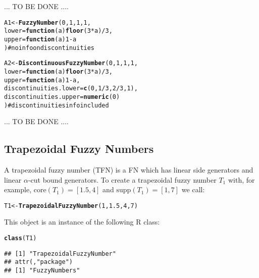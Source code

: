 \documentclass[11pt]{article}\usepackage{graphicx, color}
\makeatletter
\newcommand{\hlfunctioncall}[1]{\textcolor[rgb]{0.501960784313725,0,0.329411764705882}{\textbf{#1}}}%
\newcommand{\hlcomment}[1]{\textcolor[rgb]{0.180392156862745,0.6,0.341176470588235}{#1}}%
\newenvironment{kframe}{%
 \def\at@end@of@kframe{}%
 \ifinner\ifhmode%
  \def\at@end@of@kframe{\end{minipage}}%
  \begin{minipage}{\columnwidth}%
 \fi\fi%
 \def\FrameCommand##1{\hskip\@totalleftmargin \hskip-\fboxsep
 \colorbox{shadecolor}{##1}\hskip-\fboxsep
     \hskip-\linewidth \hskip-\@totalleftmargin \hskip\columnwidth}%
 \MakeFramed {\advance\hsize-\width
   \@totalleftmargin\z@ \linewidth\hsize
   \@setminipage}}%
 {\par\unskip\endMakeFramed%
 \at@end@of@kframe}
\newenvironment{knitrout}{}{} %
\newcommand{\lang}[1]{\textsf{#1}\xspace}
\newcommand{\R}{\lang{R}}
\makeatother
\begin{document}
... TO BE DONE ....

\begin{knitrout}\small
{}\color{fgcolor}\begin{kframe}
\begin{alltt}
A1 <- \hlfunctioncall{FuzzyNumber}(0,1,1,1,
         lower=\hlfunctioncall{function}(a) \hlfunctioncall{floor}(3*a)/3,
         upper=\hlfunctioncall{function}(a) 1-a
) \hlcomment{# no info on discontinuities}

A2 <- \hlfunctioncall{DiscontinuousFuzzyNumber}(0,1,1,1,
         lower=\hlfunctioncall{function}(a) \hlfunctioncall{floor}(3*a)/3,
         upper=\hlfunctioncall{function}(a) 1-a,
         discontinuities.lower=\hlfunctioncall{c}(0, 1/3, 2/3, 1),
         discontinuities.upper=\hlfunctioncall{numeric}(0)
) \hlcomment{# discontinuities info included}
\end{alltt}
\end{kframe}
\end{knitrout}




... TO BE DONE ....


\subsection{Trapezoidal Fuzzy Numbers}\label{Sec:TFNdef}

A trapezoidal fuzzy number (TFN) is a FN which has linear
side generators and linear $\alpha$-cut bound generators.
To create a trapezoidal fuzzy number $T_1$
with, for example, $\mathrm{core}(T_1)=[1.5,4]$
and $\mathrm{supp}(T_1)=[1,7]$ we call:

\begin{knitrout}\small
{}\color{fgcolor}\begin{kframe}
\begin{alltt}
T1 <- \hlfunctioncall{TrapezoidalFuzzyNumber}(1,1.5,4,7)
\end{alltt}
\end{kframe}
\end{knitrout}


\noindent
This object is an instance of the following \R class:

\begin{knitrout}\small
{}\color{fgcolor}\begin{kframe}
\begin{alltt}
\hlfunctioncall{class}(T1)
\end{alltt}
\begin{verbatim}
## [1] "TrapezoidalFuzzyNumber"
## attr(,"package")
## [1] "FuzzyNumbers"
\end{verbatim}
\end{kframe}
\end{knitrout}
\end{document}
